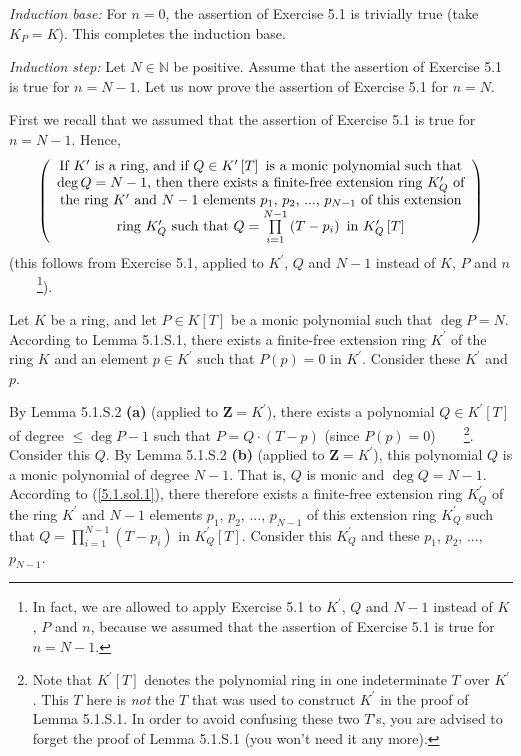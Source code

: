 \documentclass[numbers=enddot,12pt,final,onecolumn,notitlepage]{scrartcl}%
\begin{document}
\textit{Induction base:} For $n=0$, the assertion of Exercise 5.1 is trivially
true (take $K_{P}=K$). This completes the induction base.

\textit{Induction step:} Let $N\in\mathbb{N}$ be positive. Assume that the
assertion of Exercise 5.1 is true for $n=N-1$. Let us now prove the assertion
of Exercise 5.1 for $n=N$.

First we recall that we assumed that the assertion of Exercise 5.1 is true for
$n=N-1$. Hence,%
\begin{equation}
\left(
\begin{array}
[c]{c}%
\text{If }K^{\prime}\text{ is a ring, and if }Q\in K^{\prime}\left[  T\right]
\text{ is a monic polynomial such that}\\
\deg Q=N-1\text{, then there exists a finite-free extension ring }%
K_{Q}^{\prime}\text{ of}\\
\text{the ring }K^{\prime}\text{ and }N-1\text{ elements }p_{1}\text{, }%
p_{2}\text{, }...\text{, }p_{N-1}\text{ of this extension}\\
\text{ring }K_{Q}^{\prime}\text{ such that }Q=\prod\limits_{i=1}^{N-1}\left(
T-p_{i}\right)  \text{ in }K_{Q}^{\prime}\left[  T\right]
\end{array}
\right)  \label{5.1.sol.1}%
\end{equation}
(this follows from Exercise 5.1, applied to $K^{\prime}$, $Q$ and $N-1$
instead of $K$, $P$ and $n$\ \ \ \ \footnote{In fact, we are allowed to apply
Exercise 5.1 to $K^{\prime}$, $Q$ and $N-1$ instead of $K$, $P$ and $n$,
because we assumed that the assertion of Exercise 5.1 is true for $n=N-1$.}).

Let $K$ be a ring, and let $P\in K\left[  T\right]  $ be a monic polynomial
such that $\deg P=N$. According to Lemma 5.1.S.1, there exists a finite-free
extension ring $K^{\prime}$ of the ring $K$ and an element $p\in K^{\prime}$
such that $P\left(  p\right)  =0$ in $K^{\prime}$. Consider these $K^{\prime}$
and $p$.

By Lemma 5.1.S.2 \textbf{(a)} (applied to $\mathbf{Z}=K^{\prime}$), there
exists a polynomial $Q\in K^{\prime}\left[  T\right]  $ of degree $\leq\deg
P-1$ such that $P=Q\cdot\left(  T-p\right)  $ (since $P\left(  p\right)
=0$)\ \ \ \ \footnote{Note that $K^{\prime}\left[  T\right]  $ denotes the
polynomial ring in one indeterminate $T$ over $K^{\prime}$. This $T$ here is
\textit{not} the $T$ that was used to construct $K^{\prime}$ in the proof of
Lemma 5.1.S.1. In order to avoid confusing these two $T$'s, you are advised to
forget the proof of Lemma 5.1.S.1 (you won't need it any more).}. Consider
this $Q$. By Lemma 5.1.S.2 \textbf{(b)} (applied to $\mathbf{Z}=K^{\prime}$),
this polynomial $Q$ is a monic polynomial of degree $N-1$. That is, $Q$ is
monic and $\deg Q=N-1$. According to (\ref{5.1.sol.1}), there therefore exists
a finite-free extension ring $K_{Q}^{\prime}$ of the ring $K^{\prime}$ and
$N-1$ elements $p_{1}$, $p_{2}$, $...$, $p_{N-1}$ of this extension ring
$K_{Q}^{\prime}$ such that $Q=\prod\limits_{i=1}^{N-1}\left(  T-p_{i}\right)
$ in $K_{Q}^{\prime}\left[  T\right]  $. Consider this $K_{Q}^{\prime}$ and
these $p_{1}$, $p_{2}$, $...$, $p_{N-1}$.
\end{document}
